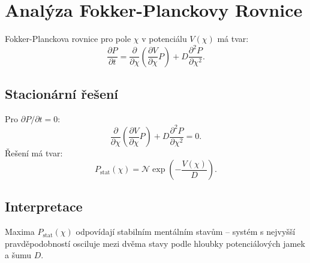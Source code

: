 \documentclass{article}
\begin{document}
\section*{Analýza Fokker-Planckovy Rovnice}

Fokker-Planckova rovnice pro pole $\chi$ v potenciálu $V(\chi)$ má tvar:
\[
\frac{\partial P}{\partial t} = \frac{\partial}{\partial \chi} \left( \frac{\partial V}{\partial \chi} P \right) + D \frac{\partial^2 P}{\partial \chi^2}.
\]

\subsection*{Stacionární řešení}
Pro $\partial P/\partial t = 0$:
\[
\frac{\partial}{\partial \chi} \left( \frac{\partial V}{\partial \chi} P \right) + D \frac{\partial^2 P}{\partial \chi^2} = 0.
\]
Řešení má tvar:
\[
P_{\text{stat}}(\chi) = \mathcal{N} \exp\left(-\frac{V(\chi)}{D}\right).
\]

\subsection*{Interpretace}
Maxima $P_{\text{stat}}(\chi)$ odpovídají stabilním mentálním stavům – systém s nejvyšší pravděpodobností osciluje mezi dvěma stavy podle hloubky potenciálových jamek a šumu $D$.
\end{document}
